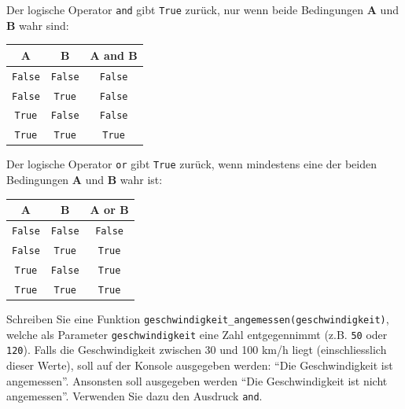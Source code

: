 \begin{mydefinition}

Der logische Operator \lstinline|and| gibt \lstinline|True| zurück, nur wenn beide Bedingungen \textbf{A} und \textbf{B} wahr sind:

\begin{table}[H]
	\centering
	\begin{tabular}{ccc}
		\textbf{A} & \textbf{B} & \textbf{A and B} \\\midrule
		\lstinline|False| & \lstinline|False| & \lstinline|False| \\
		\lstinline|False| & \lstinline|True| & \lstinline|False| \\
		\lstinline|True| & \lstinline|False| & \lstinline|False| \\
		\lstinline|True| & \lstinline|True| & \lstinline|True|
	\end{tabular}
\end{table}
\end{mydefinition}

\begin{mydefinition}

Der logische Operator \lstinline|or| gibt \lstinline|True| zurück, wenn mindestens eine der beiden Bedingungen \textbf{A} und \textbf{B} wahr ist:

\begin{table}[H]
	\centering
	\begin{tabular}{ccc}
		\textbf{A} & \textbf{B} & \textbf{A or B} \\\midrule
		\lstinline|False| & \lstinline|False| & \lstinline|False| \\
		\lstinline|False| & \lstinline|True| & \lstinline|True| \\
		\lstinline|True| & \lstinline|False| & \lstinline|True| \\
		\lstinline|True| & \lstinline|True| & \lstinline|True|
	\end{tabular}
\end{table}
\end{mydefinition}

\begin{myexercise}\label{ex:geschwindigkeitAngemessen}
	Schreiben Sie eine Funktion \lstinline|geschwindigkeit_angemessen(geschwindigkeit)|, welche als Parameter \lstinline|geschwindigkeit| eine Zahl entgegennimmt (z.B. \lstinline|50| oder \lstinline|120|). Falls die Geschwindigkeit zwischen 30 und 100 km/h liegt (einschliesslich dieser Werte), soll auf der Konsole ausgegeben werden: \enquote{Die Geschwindigkeit ist angemessen}. Ansonsten soll ausgegeben werden \enquote{Die Geschwindigkeit ist nicht angemessen}. Verwenden Sie dazu den Ausdruck \lstinline|and|.
	\begin{myanswer}
		
	\end{myanswer}
\end{myexercise}

